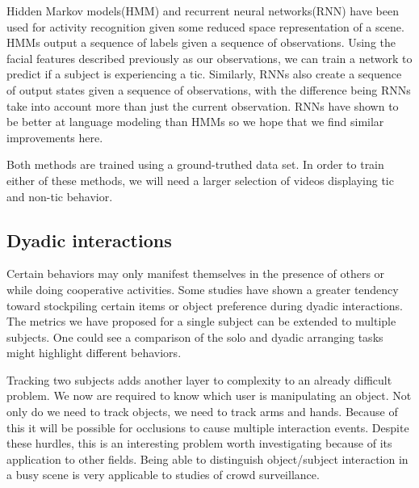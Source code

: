 \documentclass[11pt]{article}
\begin{document}
Hidden Markov models(HMM) and recurrent neural networks(RNN) have been used for activity recognition given some reduced space representation of a scene. HMMs output a sequence of labels given a sequence of observations. Using the facial features described previously as our observations, we can train a network to predict if a subject is experiencing a tic. Similarly, RNNs also create a sequence of output states given a sequence of observations, with the difference being RNNs take into account more than just the current observation. RNNs have shown to be better at language modeling than HMMs so we hope that we find similar improvements here.

Both methods are trained using a ground-truthed data set. In order to train either of these methods, we will need a larger selection of videos displaying tic and non-tic behavior.

\subsection{Dyadic interactions}
Certain behaviors may only manifest themselves in the presence of others or while doing cooperative activities. Some studies have shown a greater tendency toward stockpiling certain items or object preference during dyadic interactions. The metrics we have proposed for a single subject can be extended to multiple subjects. One could see a comparison of the solo and dyadic arranging tasks might highlight different behaviors.

Tracking two subjects adds another layer to complexity to an already difficult problem. We now are required to know which user is manipulating an object. Not only do we need to track objects, we need to track arms and hands. Because of this it will be possible for occlusions to cause multiple interaction events. Despite these hurdles, this is an interesting problem worth investigating because of its application to other fields. Being able to distinguish object/subject interaction in a busy scene is very applicable to studies of crowd surveillance.
\end{document}

